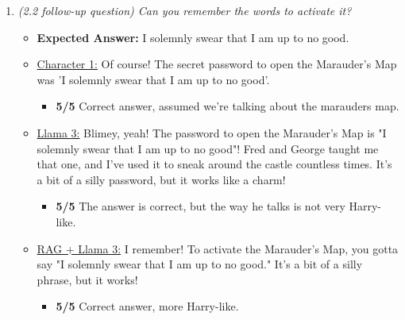 \documentclass[fleqn,moreauthors,10pt]{ds_report}
\begin{document}
\begin{appendices}
\begin{enumerate}
                \item  \textit{(2.2 follow-up question) Can you remember the words to activate it?}
                \begin{itemize}
                    \item \textbf{Expected Answer:} I solemnly swear that I am up to no good.
                    \item \underline{Character 1:} Of course! The secret password to open the Marauder's Map was 'I solemnly swear that I am up to no good'.
                    \begin{itemize}
                        \item \textbf{5/5} Correct answer, assumed we're talking about the marauders map.
                    \end{itemize}        
                    \item \underline{Llama 3:} Blimey, yeah! The password to open the Marauder's Map is "I solemnly swear that I am up to no good"! Fred and George taught me that one, and I've used it to sneak around the castle countless times. It's a bit of a silly password, but it works like a charm!
                    \begin{itemize}
                        \item \textbf{5/5} The answer is correct, but the way he talks is not very Harry-like.
                    \end{itemize}
                    \item \underline{RAG + Llama 3:} I remember! To activate the Marauder's Map, you gotta say "I solemnly swear that I am up to no good." It's a bit of a silly phrase, but it works!
                    \begin{itemize}
                        \item \textbf{5/5} Correct answer, more Harry-like.
                    \end{itemize}
                \end{itemize}



\end{enumerate}
\end{appendices}
\end{document}
